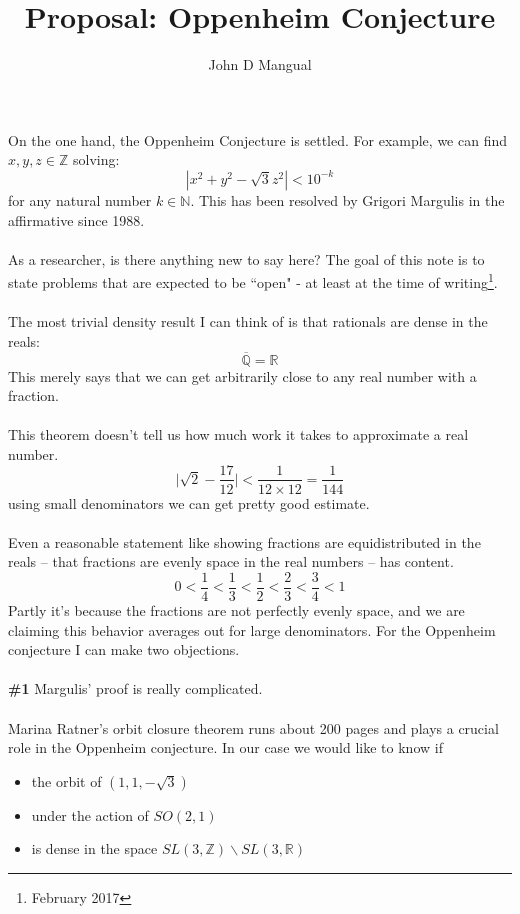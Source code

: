 \documentclass[12pt]{article}
\title{\textbf{Proposal: Oppenheim Conjecture}}
\author{John D Mangual}
\date{}
\begin{document}
\selectfont \fontsize{20}{25}\selectfont

\maketitle

\noindent On the one hand, the Oppenheim Conjecture is settled.  For example, we can find $x,y,z \in \mathbb{Z}$ solving:
$$ |x^2 + y^2 - \sqrt{3} z^2 | < 10^{-k} $$
for any natural number $ k \in \mathbb{N}$.  This has been resolved by Grigori Margulis in the affirmative since 1988. \\ \\
As a researcher, is there anything new to say here?  The goal of this note is to state problems that are expected to be ``open" - at least at the time of writing\footnote{February 2017}. \\ \\
The most trivial density result I can think of is that rationals are dense in the reals:
$$  \overline{\mathbb{Q}} = \mathbb{R}$$
This merely says that we can get arbitrarily close to any real number with a fraction.  \\ \\
This theorem doesn't tell us how much work it takes to approximate a real number.  
$$ \Big| \sqrt{2} - \frac{17}{12} \Big| < \frac{1}{12 \times 12} = \frac{1}{144}$$
using small denominators we can get pretty good estimate. \\ \\
Even a reasonable statement like showing fractions are equidistributed in the reals -- that fractions are evenly space in the real numbers -- has content.
$$ 0 <  \frac{1}{4} < \frac{1}{3} < \frac{1}{2}  < \frac{2}{3} <  \frac{3}{4} < 1$$
Partly it's because the fractions are not perfectly evenly space, and we are claiming this behavior averages out for large denominators. For the Oppenheim conjecture I can make two objections.  
 \\ \\
\textbf{\#1} Margulis' proof is really complicated. \\ \\
Marina Ratner's orbit closure theorem runs about 200 pages and plays a crucial role in the Oppenheim conjecture.  In our case we would like to know if 
\begin{itemize}
\item the orbit of $(1,1,-\sqrt{3})$ 
\item under the action of $SO(2,1)$
\item is dense in the space $SL(3, \mathbb{Z})\backslash SL(3,\mathbb{R}) $ 
\end{itemize}
\end{document}
